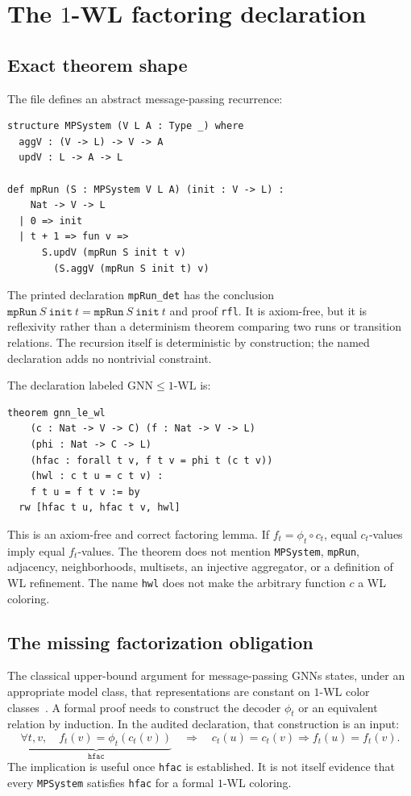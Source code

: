 \documentclass[10pt,letterpaper]{article}
\theoremstyle{definition}
\begin{document}
\section{The \(1\)-WL factoring declaration}\label{sec:wl}

\subsection{Exact theorem shape}
The file defines an abstract message-passing recurrence:
\begin{lstlisting}[language={},caption={The abstract message-passing system.}]
structure MPSystem (V L A : Type _) where
  aggV : (V -> L) -> V -> A
  updV : L -> A -> L

def mpRun (S : MPSystem V L A) (init : V -> L) :
    Nat -> V -> L
  | 0 => init
  | t + 1 => fun v =>
      S.updV (mpRun S init t v)
        (S.aggV (mpRun S init t) v)
\end{lstlisting}
The printed declaration \texttt{mpRun\_det} has the conclusion
\(\texttt{mpRun}\ S\ \texttt{init}\ t =
\texttt{mpRun}\ S\ \texttt{init}\ t\) and proof \texttt{rfl}. It is
axiom-free, but it is reflexivity rather than a determinism theorem comparing
two runs or transition relations. The recursion itself is deterministic by
construction; the named declaration adds no nontrivial constraint.

The declaration labeled \(\mathrm{GNN}\leq 1\text{-WL}\) is:
\begin{lstlisting}[language={},caption={The exact logical core of \texttt{gnn\_le\_wl}.}]
theorem gnn_le_wl
    (c : Nat -> V -> C) (f : Nat -> V -> L)
    (phi : Nat -> C -> L)
    (hfac : forall t v, f t v = phi t (c t v))
    (hwl : c t u = c t v) :
    f t u = f t v := by
  rw [hfac t u, hfac t v, hwl]
\end{lstlisting}
This is an axiom-free and correct factoring lemma. If \(f_t=\phi_t\circ c_t\),
equal \(c_t\)-values imply equal \(f_t\)-values. The theorem does not mention
\texttt{MPSystem}, \texttt{mpRun}, adjacency, neighborhoods, multisets, an
injective aggregator, or a definition of WL refinement. The name
\texttt{hwl} does not make the arbitrary function \(c\) a WL coloring.

\subsection{The missing factorization obligation}
The classical upper-bound argument for message-passing GNNs states, under an
appropriate model class, that representations are constant on \(1\)-WL color
classes~\cite{xu2019gin,morris2019wl}. A formal proof needs to construct the
decoder \(\phi_t\) or an equivalent relation by induction. In the audited
declaration, that construction is an input:
\[
\underbrace{\forall t,v,\quad f_t(v)=\phi_t(c_t(v))}_{\texttt{hfac}}
\quad\Longrightarrow\quad
c_t(u)=c_t(v)\Longrightarrow f_t(u)=f_t(v).
\]
The implication is useful once \texttt{hfac} is established. It is not itself
evidence that every \texttt{MPSystem} satisfies \texttt{hfac} for a formal
\(1\)-WL coloring.
\end{document}

